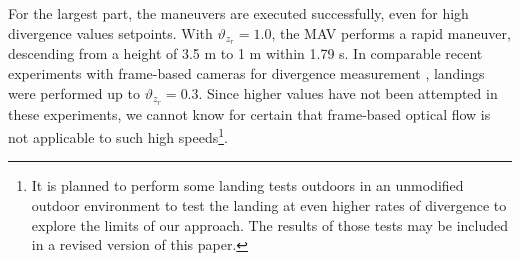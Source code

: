 For the largest part, the maneuvers are executed successfully, even for high divergence values setpoints. With $\vartheta_{z_r}=1.0$, the MAV performs a rapid maneuver, descending from a height of 3.5 m to 1 m within 1.79 s. In comparable recent experiments with frame-based cameras for divergence measurement \cite{Ho2016a}, landings were performed up to $\vartheta_{z_r}=0.3$. Since higher values have not been attempted in these experiments, we cannot know for certain that frame-based optical flow is not applicable to such high speeds\footnote{It is planned to perform some landing tests outdoors in an unmodified outdoor environment to test the landing at even higher rates of divergence to explore the limits of our approach. The results of those tests may be included in a revised version of this paper.}.
